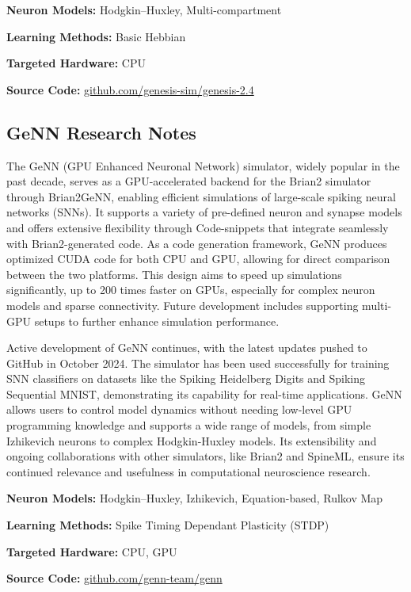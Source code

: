 \begin{tcolorbox}[enhanced,attach boxed title to top center={yshift=-3mm,yshifttext=-1mm}, colback=blue!5!white,colframe=blue!75!black,colbacktitle=red!80!black, title=Genesis at a Glance,fonttitle=\bfseries, boxed title style={size=small,colframe=red!50!black} ]

\textbf{Neuron Models:} Hodgkin–Huxley, Multi-compartment

\textbf{Learning Methods:} Basic Hebbian  

\textbf{Targeted Hardware:} CPU 

\textbf{Source Code:} \href{https://github.com/genesis-sim/genesis-2.4}{github.com/genesis-sim/genesis-2.4}
\end{tcolorbox}
\subsection*{GeNN Research Notes}\label{GeNN}

The GeNN (GPU Enhanced Neuronal Network) simulator, widely popular in the past decade, serves as a GPU-accelerated backend for the Brian2 simulator through Brian2GeNN, enabling efficient simulations of large-scale spiking neural networks (SNNs). It supports a variety of pre-defined neuron and synapse models and offers extensive flexibility through Code-snippets that integrate seamlessly with Brian2-generated code. As a code generation framework, GeNN produces optimized CUDA code for both CPU and GPU, allowing for direct comparison between the two platforms. This design aims to speed up simulations significantly, up to 200 times faster on GPUs, especially for complex neuron models and sparse connectivity. Future development includes supporting multi-GPU setups to further enhance simulation performance.

Active development of GeNN continues, with the latest updates pushed to GitHub in October 2024. The simulator has been used successfully for training SNN classifiers on datasets like the Spiking Heidelberg Digits and Spiking Sequential MNIST, demonstrating its capability for real-time applications. GeNN allows users to control model dynamics without needing low-level GPU programming knowledge and supports a wide range of models, from simple Izhikevich neurons to complex Hodgkin-Huxley models. Its extensibility and ongoing collaborations with other simulators, like Brian2 and SpineML, ensure its continued relevance and usefulness in computational neuroscience research.

\begin{tcolorbox}[enhanced,attach boxed title to top center={yshift=-3mm,yshifttext=-1mm}, colback=blue!5!white,colframe=blue!75!black,colbacktitle=red!80!black, title=GeNN at a Glance,fonttitle=\bfseries, boxed title style={size=small,colframe=red!50!black} ]

\textbf{Neuron Models:} Hodgkin–Huxley, Izhikevich, Equation-based, Rulkov Map

\textbf{Learning Methods:} Spike Timing Dependant Plasticity (STDP)  

\textbf{Targeted Hardware:} CPU, GPU 

\textbf{Source Code:} \href{https://github.com/genn-team/genn}{github.com/genn-team/genn}
\end{tcolorbox}
